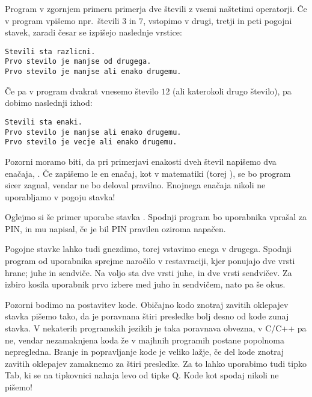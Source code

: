 
Program v zgornjem primeru primerja dve števili z vsemi naštetimi operatorji.
Če v program vpišemo npr.~števili $3$ in $7$, vstopimo v drugi, tretji in peti
pogojni stavek, zaradi česar se izpišejo naslednje vrstice:
%
\begin{verbatim}
Stevili sta razlicni.
Prvo stevilo je manjse od drugega.
Prvo stevilo je manjse ali enako drugemu.
\end{verbatim}
%
Če pa v program dvakrat vnesemo število $12$ (ali katerokoli drugo število), pa
dobimo naslednji izhod:
%
\begin{verbatim}
Stevili sta enaki.
Prvo stevilo je manjse ali enako drugemu.
Prvo stevilo je vecje ali enako drugemu.
\end{verbatim}

Pozorni moramo biti, da pri primerjavi enakosti dveh števil napišemo dva
enačaja, \koda{==}.
Če zapišemo le en enačaj, kot v matematiki (torej \koda{=}), se bo program sicer
zagnal, vendar ne bo deloval pravilno.
Enojnega enačaja nikoli ne uporabljamo v pogoju  stavka!

Oglejmo si še primer uporabe stavka .
Spodnji program bo uporabnika vprašal za PIN, in mu napisal, če je bil PIN
pravilen oziroma napačen.


Pogojne stavke lahko tudi gnezdimo, torej vstavimo enega v drugega.
Spodnji program od uporabnika sprejme naročilo v restavraciji, kjer ponujajo
dve vrsti hrane; juhe in sendviče.
Na voljo sta dve vrsti juhe, in dve vrsti sendvičev.
Za izbiro kosila uporabnik prvo izbere med juho in sendvičem, nato pa še okus.


Pozorni bodimo na postavitev kode.
Običajno kodo znotraj zavitih oklepajev  stavka pišemo tako, da je
poravnana štiri presledke bolj desno od kode zunaj  stavka.
V nekaterih programskih jezikih je taka poravnava obvezna, v C/C++ pa ne, vendar
nezamaknjena koda že v majhnih programih postane popolnoma nepregledna.
Branje in popravljanje kode je veliko lažje, če del kode znotraj zavitih
oklepajev zamaknemo za štiri presledke.
Za to lahko uporabimo tudi tipko Tab, ki se na tipkovnici nahaja levo od tipke
Q.
Kode kot spodaj nikoli ne pišemo!


